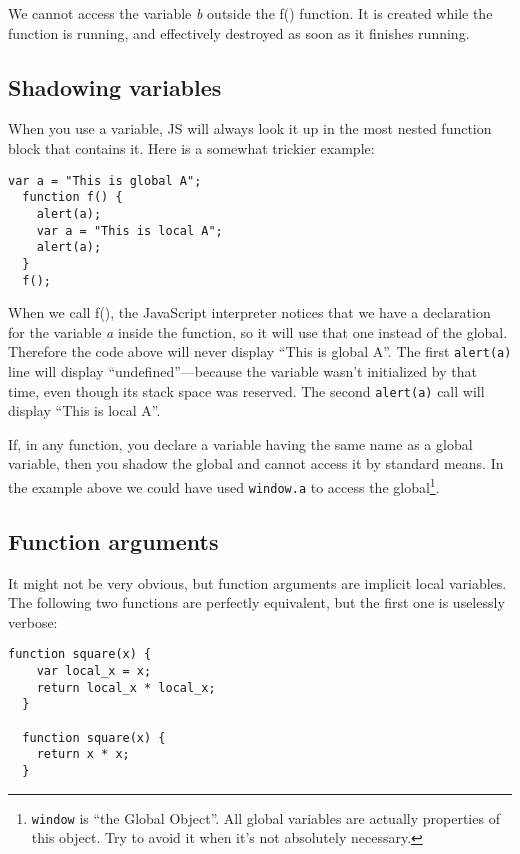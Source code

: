 We cannot access the variable \emph{b} outside the f() function.  It is
created while the function is running, and effectively destroyed as soon as it
finishes running.

\subsection{Shadowing variables}

When you use a variable, JS will always look it up in the most nested function
block that contains it.  Here is a somewhat trickier example:

\begin{lstlisting}[nolol]
  var a = "This is global A";
  function f() {
    alert(a);
    var a = "This is local A";
    alert(a);
  }
  f();
\end{lstlisting}

When we call f(), the JavaScript interpreter notices that we have a declaration
for the variable \emph{a} inside the function, so it will use that one instead
of the global.  Therefore the code above will never display “This is global A”.
The first \lstinline{alert(a)} line will display “undefined”—because the
variable wasn't initialized by that time, even though its stack space was
reserved.  The second \lstinline{alert(a)} call will display “This is local A”.

If, in any function, you declare a variable having the same name as a global
variable, then you shadow the global and cannot access it by standard means.
In the example above we could have used \lstinline{window.a} to access the
global\footnote{\lstinline{window} is “the Global Object”.  All global
  variables are actually properties of this object.  Try to avoid it when it's
  not absolutely necessary.}.

\subsection{Function arguments}

It might not be very obvious, but function arguments are implicit local
variables.  The following two functions are perfectly equivalent, but the first
one is uselessly verbose:

\begin{lstlisting}[nolol]
  function square(x) {
    var local_x = x;
    return local_x * local_x;
  }

  function square(x) {
    return x * x;
  }
\end{lstlisting}

